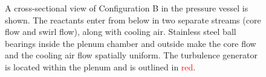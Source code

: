 \begin{figure}
\begin{tikzpicture}
\end{tikzpicture}

\caption[Detail schematic of Configuration B]{A cross-sectional view of Configuration B in the pressure vessel is shown. The reactants enter from below in two separate streams (core flow and swirl flow), along with cooling air. Stainless steel ball bearings inside the plenum chamber and outside make the core flow and the cooling air flow spatially uniform. The turbulence generator is located within the plenum and is outlined in \textcolor{red}{red}.}

\label{fig:lsbB}

\end{figure}

